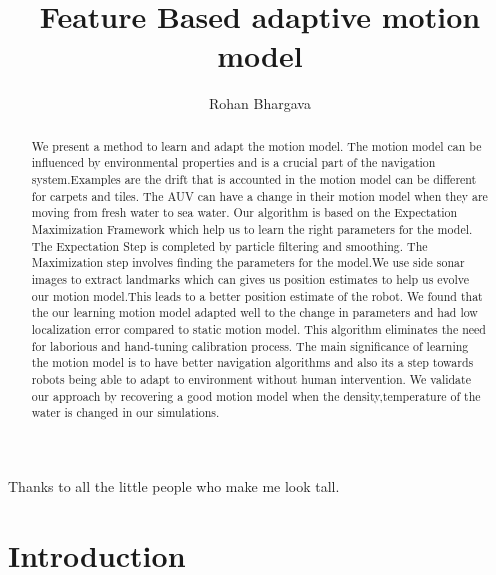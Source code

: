 \documentclass[12pt,draft]{dalcsthesis}
\begin{document}
\mcs  %
\title{Feature Based adaptive motion model}
\author{Rohan Bhargava}


\providecommand{\tabularnewline}{\\}
\newcommand{\lyxdot}{.}
\nolistoftables
\nolistoffigures

\frontmatter


\begin{abstract}
We present a method to learn and adapt the motion model. The motion model can be influenced by environmental properties and is a crucial part of the navigation system.Examples are the drift that is accounted in the motion model can be different for carpets and tiles. The AUV can have a change in their motion model when they are moving from fresh water to sea water. Our algorithm is based on the Expectation Maximization Framework which help us to learn the right parameters for the model.
The Expectation Step is completed by particle filtering and smoothing. The Maximization step involves finding the parameters for the model.We use side sonar images to extract landmarks which can gives us position estimates to help us evolve our motion model.This leads to a better position estimate of the robot. 
We found that the our learning motion model adapted well to the change in parameters and had low localization error compared to static motion model. 
This algorithm eliminates the need for laborious and hand-tuning calibration process. The main significance of learning the motion model is to have better navigation algorithms and also its a step towards robots being able to adapt to environment without human intervention.
We validate our approach by recovering a good motion model when the density,temperature of the water is changed in our simulations. 
\end{abstract}

\begin{acknowledgements}
Thanks to all the little people who make me look tall.
\end{acknowledgements}

\mainmatter

\chapter{Introduction}
 
\end{document}

